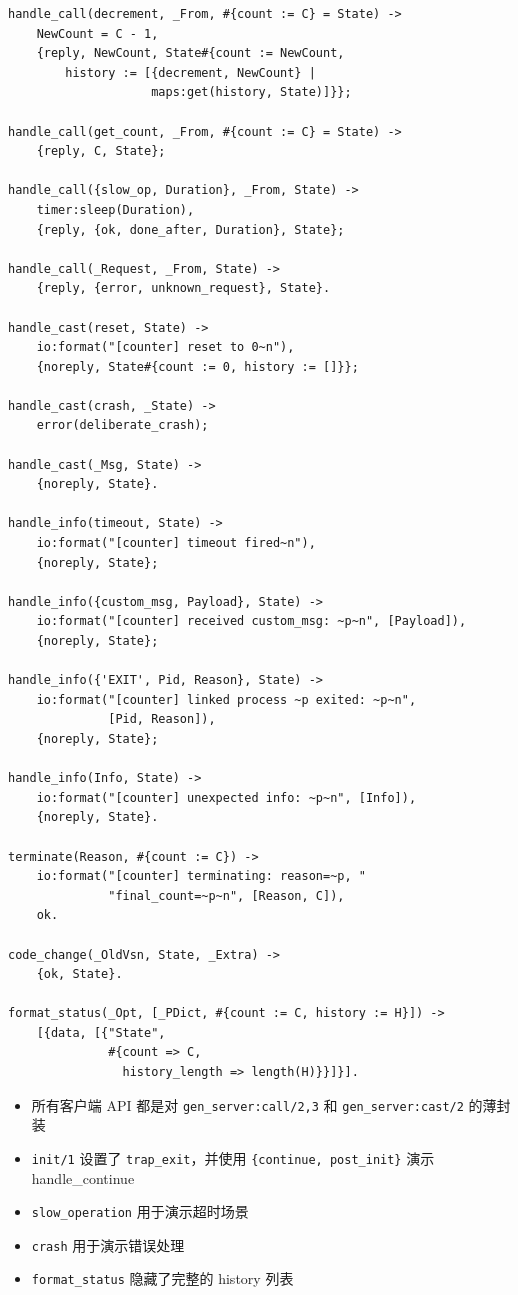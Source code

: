 \documentclass[a4paper,11pt]{article}
\begin{document}
\begin{lstlisting}[style=erlangstyle, caption={counter\_server.erl --- 贯穿全文的回调模块}]
handle_call(decrement, _From, #{count := C} = State) ->
    NewCount = C - 1,
    {reply, NewCount, State#{count := NewCount,
        history := [{decrement, NewCount} |
                    maps:get(history, State)]}};

handle_call(get_count, _From, #{count := C} = State) ->
    {reply, C, State};

handle_call({slow_op, Duration}, _From, State) ->
    timer:sleep(Duration),
    {reply, {ok, done_after, Duration}, State};

handle_call(_Request, _From, State) ->
    {reply, {error, unknown_request}, State}.

handle_cast(reset, State) ->
    io:format("[counter] reset to 0~n"),
    {noreply, State#{count := 0, history := []}};

handle_cast(crash, _State) ->
    error(deliberate_crash);

handle_cast(_Msg, State) ->
    {noreply, State}.

handle_info(timeout, State) ->
    io:format("[counter] timeout fired~n"),
    {noreply, State};

handle_info({custom_msg, Payload}, State) ->
    io:format("[counter] received custom_msg: ~p~n", [Payload]),
    {noreply, State};

handle_info({'EXIT', Pid, Reason}, State) ->
    io:format("[counter] linked process ~p exited: ~p~n",
              [Pid, Reason]),
    {noreply, State};

handle_info(Info, State) ->
    io:format("[counter] unexpected info: ~p~n", [Info]),
    {noreply, State}.

terminate(Reason, #{count := C}) ->
    io:format("[counter] terminating: reason=~p, "
              "final_count=~p~n", [Reason, C]),
    ok.

code_change(_OldVsn, State, _Extra) ->
    {ok, State}.

format_status(_Opt, [_PDict, #{count := C, history := H}]) ->
    [{data, [{"State",
              #{count => C,
                history_length => length(H)}}]}].
\end{lstlisting}

\begin{tipbox}[设计要点]
\begin{itemize}[leftmargin=1.5em]
    \item 所有客户端 API 都是对 \texttt{gen\_server:call/2,3} 和 \texttt{gen\_server:cast/2} 的薄封装
    \item \texttt{init/1} 设置了 \texttt{trap\_exit}，并使用 \texttt{\{continue, post\_init\}} 演示 handle\_continue
    \item \texttt{slow\_operation} 用于演示超时场景
    \item \texttt{crash} 用于演示错误处理
    \item \texttt{format\_status} 隐藏了完整的 history 列表
\end{itemize}
\end{tipbox}
\end{document}
